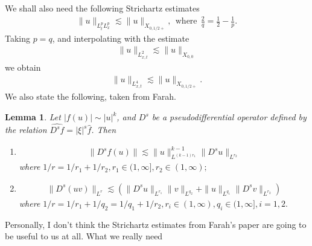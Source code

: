 \documentclass{amsart}
\newtheorem{lemma}[theorem]{Lemma}
\newcommand{\wh}{\widehat}
\begin{document}
We shall also need the following Strichartz estimates
\begin{equation*}
\begin{split}
\| u \|_{L^{p}_{t} L^{p}_{x}} \lesssim \| u \|_{X_{0, 1/2+}}, \ \ \text{where} \ \ \frac{2}{q} = \frac{1}{2} - \frac{1}{p}.
\end{split}
\end{equation*}
Taking $p=q$, and interpolating with the estimate
\begin{equation*}
\begin{split}
\| u \|_{L^{2}_{x,t}} \lesssim \| u \|_{X_{0,0}}
\end{split}
\end{equation*}
we obtain
\begin{equation*}
\begin{split}
\| u \|_{L^{4}_{x,t}} \lesssim \| u \|_{X_{0, 1/2+}}.
\end{split}
\end{equation*}
We also state the following, taken from Farah.
\begin{lemma}
Let $|f(u)| \sim |u|^{k}$, and $D^{s}$ be a pseudodifferential operator defined by the relation $\wh{D^{s} f} = | \xi |^{s} \wh{f}$. Then
\begin{enumerate}
  \item 
    \begin{equation*}
    \begin{split}
      \| D^{s} f(u) \| \lesssim \| u \|^{k-1}_{L^{(k-1)r_1}} \| D^{s}u \|_{L^{r_{2}}}
    \end{split}
    \end{equation*}
 where $1/r = 1/r_{1} + 1/r_{2}, r_{1} \in (1, \infty], r_{2} \in (1, \infty);$ 
\item{}
\begin{equation*}
\begin{split}
\| D^{s}(uv) \|_{L^{r}} \lesssim (\| D^{s}u \|_{L^{r_{1}}} \| v \|_{L^{q_{2}}} + \| u \|_{L^{q_{1}}} \| D^{s} v \|_{L^{r_{2}}})
\end{split}
\end{equation*}
where $1/r = 1/r_{1} + 1/q_{2} = 1/q_{1} + 1/r_{2}, r_{i} \in (1, \infty), q_{i} \in (1, \infty], i=1,2.$ 
\end{enumerate}
\label{lem:frac-dif}
\end{lemma}
\begin{framed}
Personally, I don't think the Strichartz estimates from Farah's paper are going to be useful to us at all. What we really need 
\end{framed}
\end{document}
